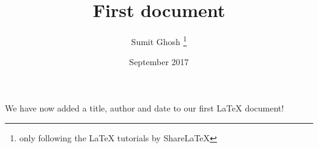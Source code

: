 \documentclass[12pt, letterpaper]{article}
\title{First document}
\author{Sumit Ghosh \thanks{only following the LaTeX tutorials by ShareLaTeX}}
\date{September 2017}
\begin{document}
\maketitle

We have now added a title, author and date to our first \LaTeX{} document!
\end{document}
